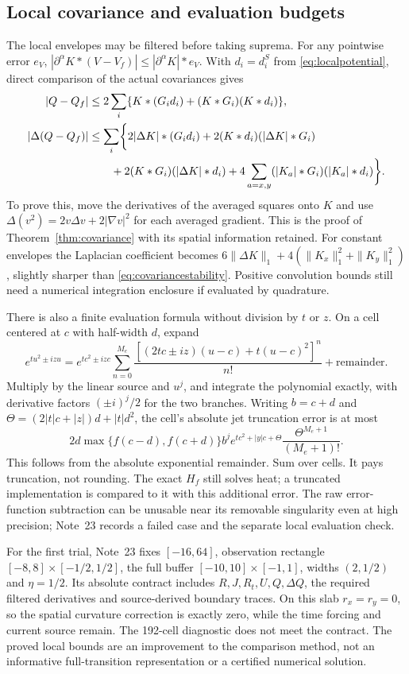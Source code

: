 \subsection{Local covariance and evaluation budgets}
The local envelopes may be filtered before taking suprema.
For any pointwise error $e_V$,
$|\partial^\alpha K*(V-V_f)|\le|\partial^\alpha K|*e_V$.
With $d_i=d_i^S$ from \eqref{eq:localpotential}, direct comparison of
the actual covariances gives
\begin{align}
 |Q-Q_f|&\le2\sum_i\{K*(G_id_i)+(K*G_i)(K*d_i)\},\notag\\
 |\Delta(Q-Q_f)|&\le\sum_i\biggl\{2|\Delta K|*(G_id_i)
 +2(K*d_i)(|\Delta K|*G_i)\notag\\
 &\qquad+2(K*G_i)(|\Delta K|*d_i)
 +4\sum_{a=x,y}(|K_a|*G_i)(|K_a|*d_i)\biggr\}.
 \label{eq:localcovariance}
\end{align}
To prove this, move the derivatives of the averaged squares onto $K$
and use $\Delta(v^2)=2v\Delta v+2|\nabla v|^2$ for each averaged
gradient. This is the proof of Theorem~\ref{thm:covariance} with its
spatial information retained. For constant envelopes the Laplacian
coefficient becomes
$6\|\Delta K\|_1+4(\|K_x\|_1^2+\|K_y\|_1^2)$, slightly sharper
than \eqref{eq:covariancestability}. Positive convolution bounds still
need a numerical integration enclosure if evaluated by quadrature.

There is also a finite evaluation formula without division by $t$ or $z$.
On a cell centered at $c$ with half-width $d$, expand
\[
 e^{tu^2\pm izu}=e^{tc^2\pm izc}
 \sum_{n=0}^{M_e}\frac{[(2tc\pm iz)(u-c)+t(u-c)^2]^n}{n!}
       +\text{remainder}.
\]
Multiply by the linear source and $u^j$, and integrate the polynomial
exactly, with derivative factors $(\pm i)^j/2$ for the two branches.
Writing $b=c+d$ and $\Theta=(2|t|c+|z|)d+|t|d^2$, the cell's
absolute jet truncation error is at most
\begin{equation}
 2d\max\{f(c-d),f(c+d)\}b^j
 e^{tc^2+|y|c+\Theta}\frac{\Theta^{M_e+1}}{(M_e+1)!}.
 \label{eq:localevaluation}
\end{equation}
This follows from the absolute exponential remainder. Sum over cells.
It pays truncation, not rounding. The exact $H_f$ still solves heat;
a truncated implementation is compared to it with this additional error.
The raw error-function subtraction can be unusable near its removable
singularity even at high precision; Note~23 records a failed case and
the separate local evaluation check.

For the first trial, Note~23 fixes $[-16,64]$, observation rectangle
$[-8,8]\times[-1/2,1/2]$, the full buffer
$[-10,10]\times[-1,1]$, widths $(2,1/2)$ and $\eta=1/2$.
Its absolute contract includes $R,J,R_t,U,Q,\Delta Q$, the required
filtered derivatives and source-derived boundary traces.
On this slab $r_x=r_y=0$, so the spatial curvature correction is exactly
zero, while the time forcing and current source remain.
The 192-cell diagnostic does not meet the contract. The proved local
bounds are an improvement to the comparison method, not an informative
full-transition representation or a certified numerical solution.
